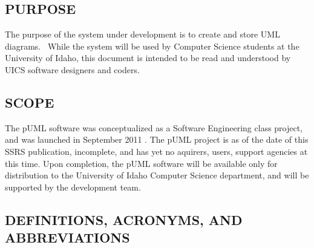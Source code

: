 \documentclass[twoside,letterpaper]{article}
\begin{document}
\subsection[PURPOSE]{\rmfamily\bfseries\color{black}
PURPOSE}
{\color{black}
The purpose of the system under development is to create and store UML diagrams.
\ While the system will be used by Computer Science students at the University of Idaho,
this document is intended to be read and understood by UICS software
designers and coders.}

\subsection[SCOPE]{\rmfamily\bfseries\color{black}
SCOPE}
{\color{black}
The pUML software was conceptualized as a Software Engineering class project, and was launched in September 2011 .  The pUML project is as of the date of this SSRS publication, incomplete, and has yet no aquirers, users, support agencies at this time. Upon completion, the pUML software will be available only for distribution to the University of Idaho Computer Science department, and will be supported by the development team. }

\subsection[DEFINITIONS, ACRONYMS, AND
ABBREVIATIONS]{\rmfamily\bfseries\color{black}
DEFINITIONS, ACRONYMS, AND ABBREVIATIONS}

\bigskip
\end{document}
